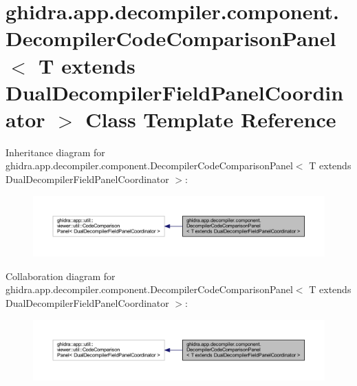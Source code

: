 \hypertarget{classghidra_1_1app_1_1decompiler_1_1component_1_1_decompiler_code_comparison_panel}{}\section{ghidra.\+app.\+decompiler.\+component.\+Decompiler\+Code\+Comparison\+Panel$<$ T extends Dual\+Decompiler\+Field\+Panel\+Coordinator $>$ Class Template Reference}
\label{classghidra_1_1app_1_1decompiler_1_1component_1_1_decompiler_code_comparison_panel}


Inheritance diagram for ghidra.\+app.\+decompiler.\+component.\+Decompiler\+Code\+Comparison\+Panel$<$ T extends Dual\+Decompiler\+Field\+Panel\+Coordinator $>$\+:
\nopagebreak
\begin{figure}[H]
\begin{center}
\leavevmode
\includegraphics[width=350pt]{classghidra_1_1app_1_1decompiler_1_1component_1_1_decompiler_code_comparison_panel__inherit__graph}
\end{center}
\end{figure}


Collaboration diagram for ghidra.\+app.\+decompiler.\+component.\+Decompiler\+Code\+Comparison\+Panel$<$ T extends Dual\+Decompiler\+Field\+Panel\+Coordinator $>$\+:
\nopagebreak
\begin{figure}[H]
\begin{center}
\leavevmode
\includegraphics[width=350pt]{classghidra_1_1app_1_1decompiler_1_1component_1_1_decompiler_code_comparison_panel__coll__graph}
\end{center}
\end{figure}
